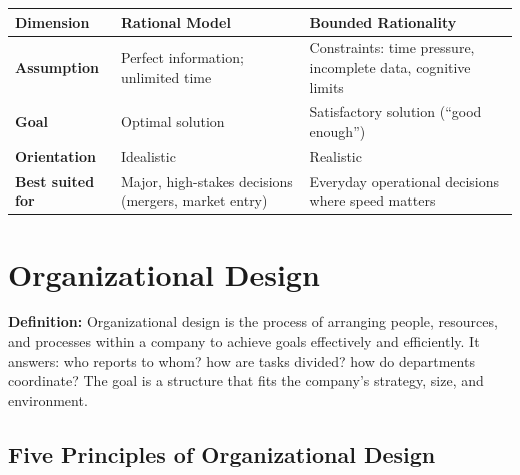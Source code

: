 \documentclass[11pt, letterpaper]{article}
\begin{document}
\begin{center}
\begin{tabular}{>{\bfseries}p{3cm} p{5.5cm} p{5.5cm}}
\toprule
Dimension & Rational Model & Bounded Rationality \\
\midrule
Assumption & Perfect information; unlimited time & Constraints: time pressure, incomplete data, cognitive limits \\
Goal & Optimal solution & Satisfactory solution (``good enough'') \\
Orientation & Idealistic & Realistic \\
Best suited for & Major, high-stakes decisions (mergers, market entry) & Everyday operational decisions where speed matters \\
\bottomrule
\end{tabular}
\end{center}

\newpage

\section{Organizational Design}

\begin{defbox}
\textbf{Definition:} Organizational design is the process of arranging people, resources, and processes within a company to achieve goals effectively and efficiently. It answers: who reports to whom? how are tasks divided? how do departments coordinate? The goal is a structure that fits the company's strategy, size, and environment.
\end{defbox}

\subsection{Five Principles of Organizational Design}
\end{document}
